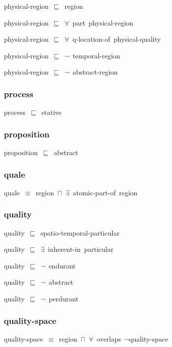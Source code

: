 \documentclass{article}
\begin{document}
physical-region~\ensuremath{\sqsubseteq}~region~

physical-region~\ensuremath{\sqsubseteq}~\ensuremath{\forall}~part~physical-region~

physical-region~\ensuremath{\sqsubseteq}~\ensuremath{\forall}~q-location-of~physical-quality~

physical-region~\ensuremath{\sqsubseteq}~\ensuremath{\lnot}~temporal-region

physical-region~\ensuremath{\sqsubseteq}~\ensuremath{\lnot}~abstract-region

\subsubsection*{process}

process~\ensuremath{\sqsubseteq}~stative~

\subsubsection*{proposition}

proposition~\ensuremath{\sqsubseteq}~abstract~

\subsubsection*{quale}

quale~\ensuremath{\equiv}~region~\ensuremath{\sqcap}~\ensuremath{\exists}~atomic-part-of~region

\subsubsection*{quality}

quality~\ensuremath{\sqsubseteq}~spatio-temporal-particular~

quality~\ensuremath{\sqsubseteq}~\ensuremath{\exists}~inherent-in~particular~

quality~\ensuremath{\sqsubseteq}~\ensuremath{\lnot}~endurant

quality~\ensuremath{\sqsubseteq}~\ensuremath{\lnot}~abstract

quality~\ensuremath{\sqsubseteq}~\ensuremath{\lnot}~perdurant

\subsubsection*{quality-space}

quality-space~\ensuremath{\equiv}~region~\ensuremath{\sqcap}~\ensuremath{\forall}~overlaps~\ensuremath{\lnot}quality-space
\end{document}
